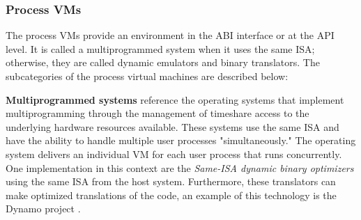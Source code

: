     


	\subsubsection{Process VMs}
	
	The process VMs provide an environment in the ABI interface or at the API level. 
	It is called a multiprogrammed system when it uses the same ISA; otherwise, they are called dynamic emulators and binary translators. 
	The subcategories of the process virtual machines are described below:
	
		

	\textbf{Multiprogrammed systems} reference the operating systems that implement multiprogramming through the management of timeshare access to the underlying hardware resources available. These systems use the same ISA and have the ability to handle multiple user processes "simultaneously." The operating system delivers an individual VM for each user process that runs concurrently. One implementation in this context are the \textit{Same-ISA dynamic binary optimizers} using the same ISA from the host system. Furthermore, these translators can make optimized translations of the code, an example of this technology is the Dynamo project \cite{Bala2011}.
		
